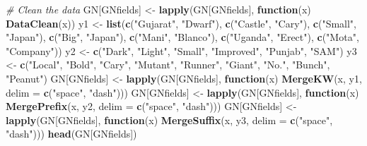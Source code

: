 \documentclass[]{article}
\newenvironment{Shaded}{\begin{snugshade}}{\end{snugshade}}
\newcommand{\CommentTok}[1]{\textcolor[rgb]{0.56,0.35,0.01}{\textit{#1}}}
\newcommand{\ControlFlowTok}[1]{\textcolor[rgb]{0.13,0.29,0.53}{\textbf{#1}}}
\newcommand{\DataTypeTok}[1]{\textcolor[rgb]{0.13,0.29,0.53}{#1}}
\newcommand{\KeywordTok}[1]{\textcolor[rgb]{0.13,0.29,0.53}{\textbf{#1}}}
\newcommand{\NormalTok}[1]{#1}
\newcommand{\StringTok}[1]{\textcolor[rgb]{0.31,0.60,0.02}{#1}}
\begin{document}
\begin{Shaded}
\begin{Highlighting}[]
\CommentTok{# Clean the data}
\NormalTok{GN[GNfields] <-}\StringTok{ }\KeywordTok{lapply}\NormalTok{(GN[GNfields], }\ControlFlowTok{function}\NormalTok{(x) }\KeywordTok{DataClean}\NormalTok{(x))}
\NormalTok{y1 <-}\StringTok{ }\KeywordTok{list}\NormalTok{(}\KeywordTok{c}\NormalTok{(}\StringTok{"Gujarat"}\NormalTok{, }\StringTok{"Dwarf"}\NormalTok{), }\KeywordTok{c}\NormalTok{(}\StringTok{"Castle"}\NormalTok{, }\StringTok{"Cary"}\NormalTok{), }\KeywordTok{c}\NormalTok{(}\StringTok{"Small"}\NormalTok{, }\StringTok{"Japan"}\NormalTok{),}
\KeywordTok{c}\NormalTok{(}\StringTok{"Big"}\NormalTok{, }\StringTok{"Japan"}\NormalTok{), }\KeywordTok{c}\NormalTok{(}\StringTok{"Mani"}\NormalTok{, }\StringTok{"Blanco"}\NormalTok{), }\KeywordTok{c}\NormalTok{(}\StringTok{"Uganda"}\NormalTok{, }\StringTok{"Erect"}\NormalTok{),}
\KeywordTok{c}\NormalTok{(}\StringTok{"Mota"}\NormalTok{, }\StringTok{"Company"}\NormalTok{))}
\NormalTok{y2 <-}\StringTok{ }\KeywordTok{c}\NormalTok{(}\StringTok{"Dark"}\NormalTok{, }\StringTok{"Light"}\NormalTok{, }\StringTok{"Small"}\NormalTok{, }\StringTok{"Improved"}\NormalTok{, }\StringTok{"Punjab"}\NormalTok{, }\StringTok{"SAM"}\NormalTok{)}
\NormalTok{y3 <-}\StringTok{ }\KeywordTok{c}\NormalTok{(}\StringTok{"Local"}\NormalTok{, }\StringTok{"Bold"}\NormalTok{, }\StringTok{"Cary"}\NormalTok{, }\StringTok{"Mutant"}\NormalTok{, }\StringTok{"Runner"}\NormalTok{, }\StringTok{"Giant"}\NormalTok{, }\StringTok{"No."}\NormalTok{,}
        \StringTok{"Bunch"}\NormalTok{, }\StringTok{"Peanut"}\NormalTok{)}
\NormalTok{GN[GNfields] <-}\StringTok{ }\KeywordTok{lapply}\NormalTok{(GN[GNfields],}
                       \ControlFlowTok{function}\NormalTok{(x) }\KeywordTok{MergeKW}\NormalTok{(x, y1, }\DataTypeTok{delim =} \KeywordTok{c}\NormalTok{(}\StringTok{"space"}\NormalTok{, }\StringTok{"dash"}\NormalTok{)))}
\NormalTok{GN[GNfields] <-}\StringTok{ }\KeywordTok{lapply}\NormalTok{(GN[GNfields],}
                       \ControlFlowTok{function}\NormalTok{(x) }\KeywordTok{MergePrefix}\NormalTok{(x, y2, }\DataTypeTok{delim =} \KeywordTok{c}\NormalTok{(}\StringTok{"space"}\NormalTok{, }\StringTok{"dash"}\NormalTok{)))}
\NormalTok{GN[GNfields] <-}\StringTok{ }\KeywordTok{lapply}\NormalTok{(GN[GNfields],}
                       \ControlFlowTok{function}\NormalTok{(x) }\KeywordTok{MergeSuffix}\NormalTok{(x, y3, }\DataTypeTok{delim =} \KeywordTok{c}\NormalTok{(}\StringTok{"space"}\NormalTok{, }\StringTok{"dash"}\NormalTok{)))}
\KeywordTok{head}\NormalTok{(GN[GNfields])}
\end{Highlighting}
\end{Shaded}
\end{document}
